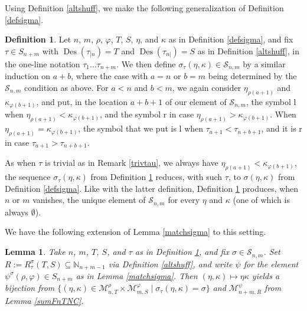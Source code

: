 \documentclass{article}
\newtheorem{lem}[thm]{Lemma}
\theoremstyle{definition}
\newtheorem{defn}[thm]{Definition}
\begin{document}
Using Definition \ref{altshuff}, we make the following generalization of Definition \ref{defsigma}.
\begin{defn}
Let $n$, $m$, $\rho$, $\varphi$, $T$, $S$, $\eta$, and $\kappa$ as in Definition \ref{defsigma}, and fix $\tau \in S_{n+m}$ with $\operatorname{Des}(\tau_{|n})=T$ and $\operatorname{Des}(\tau_{n|})=S$ as in Definition \ref{altshuff}, in the one-line notation $\tau_{1}\ldots\tau_{n+m}$. We then define $\sigma_{\tau}(\eta,\kappa)\in\mathcal{S}_{n,m}$ by a similar induction on $a+b$, where the case with $a=n$ or $b=m$ being determined by the $\mathcal{S}_{n,m}$ condition as above. For $a<n$ and $b<m$, we again consider $\eta_{\rho(a+1)}$ and $\kappa_{\varphi(b+1)}$, and put, in the location $a+b+1$ of our element of $\mathcal{S}_{n,m}$, the symbol l when $\eta_{\rho(a+1)}<\kappa_{\varphi(b+1)}$, and the symbol r in case $\eta_{\rho(a+1)}>\kappa_{\varphi(b+1)}$. When $\eta_{\rho(a+1)}=\kappa_{\varphi(b+1)}$, the symbol that we put is l when $\tau_{a+1}<\tau_{n+b+1}$, and it is r in case $\tau_{a+1}>\tau_{n+b+1}$. \label{tausigma}
\end{defn}
As when $\tau$ is trivial as in Remark \ref{trivtau}, we always have $\eta_{\rho(a+1)}<\kappa_{\varphi(b+1)}$, the sequence $\sigma_{\tau}(\eta,\kappa)$ from Definition \ref{tausigma} reduces, with such $\tau$, to $\sigma(\eta,\kappa)$ from Definition \ref{defsigma}. Like with the latter definition, Definition \ref{tausigma} produces, when $n$ or $m$ vanishes, the unique element of $\mathcal{S}_{n,m}$ for every $\eta$ and $\kappa$ (one of which is always $\emptyset$).

We have the following extension of Lemma \ref{matchsigma} to this setting.
\begin{lem}
Take $n$, $m$, $T$, $S$, and $\tau$ as in Definition \ref{tausigma}, and fix $\sigma\in\mathcal{S}_{n,m}$. Set $R:=R^{\sigma}_{\tau}(T,S)\subseteq\mathbb{N}_{n+m-1}$ via Definition \ref{altshuff}, and write $\psi$ for the element $\psi^{\sigma}(\rho,\varphi) \in S_{n+m}$ as in Lemma \ref{matchsigma}. Then $(\eta,\kappa)\mapsto\eta\kappa$ yields a bijection from $\{(\eta,\kappa)\in\mathcal{M}_{n,T}^{\rho}\times\mathcal{M}_{m,S}^{\varphi}\;|\;\sigma_{\tau}(\eta,\kappa)=\sigma\}$ and $\mathcal{M}_{n+m,R}^{\psi}$ from Lemma \ref{sumFnTNC}. \label{sigmamatch}
\end{lem}
\end{document}
